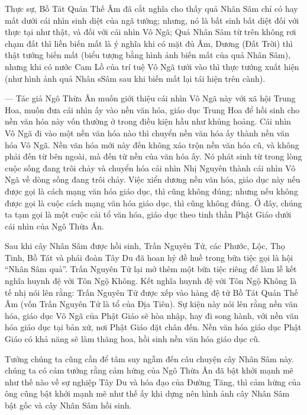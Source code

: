 Thực sự, Bồ Tát Quán Thế Âm đã cắt nghĩa cho thấy quả Nhân Sâm chỉ có hay mất dưới cái nhìn sinh diệt của ngã tướng; nhưng, nó là bất sinh bất diệt đối với thực tại như thật, và đối với cái nhìn Vô Ngã; Quả Nhân Sâm từ trên không rơi chạm đất thì liền biến mất là ý nghĩa khi có mặt đủ Âm, Dương (Đất Trời) thì thật tướng biến mất (biểu tượng bằng hình ảnh biến mất của quả Nhân Sâm), nhưng khi có nước Cam Lồ của trí tuệ Vô Ngã tưới vào thì thực tướng xuất hiện (như hình ảnh quả Nhân sSâm sau khi biến mất lại tái hiện trên cành).

— Tác giả Ngô Thừa Ân muốn giới thiệu cái nhìn Vô Ngã này với xã hội Trung Hoa, muốn đưa cái nhìn ấy vào nền văn hóa, giáo dục Trung Hoa để hồi sinh cho nền văn hóa này vốn thường ở trong điều kiện hầu như khủng hoảng. Cái nhìn Vô Ngã đi vào một nền văn hóa nào thì chuyển nền văn hóa ấy thành nền văn hóa Vô Ngã. Nền văn hóa mới này đến không xáo trộn nền văn hóa cũ, và không phải đến từ bên ngoài, mà đến từ nền của văn hóa ấy. Nó phát sinh từ trong lòng cuộc sống đang trôi chảy và chuyển hóa cái nhìn Nhị Nguyên thành cái nhìn Vô Ngã về dòng sống đang trôi chảy. Việc xiển dương nền văn hóa, giáo dục này nếu được gọi là cách mạng văn hóa giáo dục, thì cũng không đúng; nhưng nếu không được gọi là cuộc cách mạng văn hóa giáo dục, thì cũng không đúng. Ở đây, chúng ta tạm gọi là một cuộc cải tổ văn hóa, giáo dục theo tinh thần Phật Giáo dưới cái nhìn của Ngô Thừa Ân.

Sau khi cây Nhân Sâm được hồi sinh, Trấn Nguyên Tử, các Phước, Lộc, Thọ Tinh, Bồ Tát và phái đoàn Tây Du đã hoan hỷ đề huề trong bữa tiệc gọi là hội ``Nhân Sâm quả''. Trấn Nguyên Tử lại mở thêm một bữa tiệc riêng để làm lễ kết nghĩa huynh đệ với Tôn Ngộ Không. Kết nghĩa huynh đệ với Tôn Ngộ Không là tế nhị nói lên rằng: Trấn Nguyên Tử được xếp vào hàng đệ tử Bồ Tát Quán Thế Âm (vốn Trấn Nguyên Tử là tổ của Địa Tiên). Sự kiện này nói lên rằng nền văn hóa, giáo dục Vô Ngã của Phật Giáo sẽ hòa nhập, hay đi song hành, với nền văn hóa giáo dục tại bản xứ, nơi Phật Giáo đặt chân đến. Nền văn hóa giáo dục Phật Giáo có khả năng sẽ làm thăng hoa, hồi sinh nền văn hóa giáo dục cũ.

Tưởng chúng ta cũng cần để tâm suy ngẫm đến câu chuyện cây Nhân Sâm này. chúng ta có cảm tưởng rằng cảm hứng của Ngô Thừa Ân đã bật khởi mạnh mẽ như thế nào về sự nghiệp Tây Du và hóa đạo của Đường Tăng, thì cảm hứng của ông cũng bật khởi mạnh mẽ như thế ấy khi dựng nên hình ảnh cây Nhân Sâm bật gốc và cây Nhân Sâm hồi sinh.

